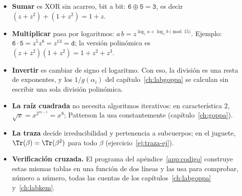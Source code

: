 \begin{itemize}[leftmargin=1.5em,itemsep=3pt]
  \item \textbf{Sumar} es XOR sin acarreo, bit a bit:
        $\mathtt{6}\oplus\mathtt{5}=\mathtt{3}$, es decir
        $(z+z^2)+(1+z^2)=1+z$.
  \item \textbf{Multiplicar} pasa por logaritmos:
        $a\,b=z^{\log_z a+\log_z b \pmod{15}}$. Ejemplo:
        $\mathtt{6}\cdot\mathtt{5}=z^{5}z^{8}=z^{13}=\mathtt{d}$;
        la versión polinómica es
        $(z+z^2)(1+z^2)=1+z^2+z^3$.
  \item \textbf{Invertir} es cambiar de signo el logaritmo. Con eso,
        la división es una resta de exponentes, y los
        $1/g(\alpha_i)$ del capítulo~\ref{ch:labgoppa} se calculan
        sin escribir una sola división polinómica.
  \item \textbf{La raíz cuadrada} no necesita algoritmos iterativos:
        en característica $2$, $\sqrt{x}=x^{2^{m-1}}=x^8$; Patterson
        la usa constantemente (capítulo~\ref{ch:goppa}).
  \item \textbf{La traza} decide irreducibilidad y pertenencia a
        subcuerpos; en el juguete, $\Tr(\beta)=\Tr(\beta^2)$ para
        todo $\beta$ (ejercicio~\ref{ej:traza-ej}).
  \item \textbf{Verificación cruzada.} El programa del
        apéndice~\ref{app:codigo} construye estas mismas tablas en
        una función de dos líneas y las usa para comprobar, número a
        número, todas las cuentas de los
        capítulos~\ref{ch:labgoppa} y~\ref{ch:labkem}.
\end{itemize}
